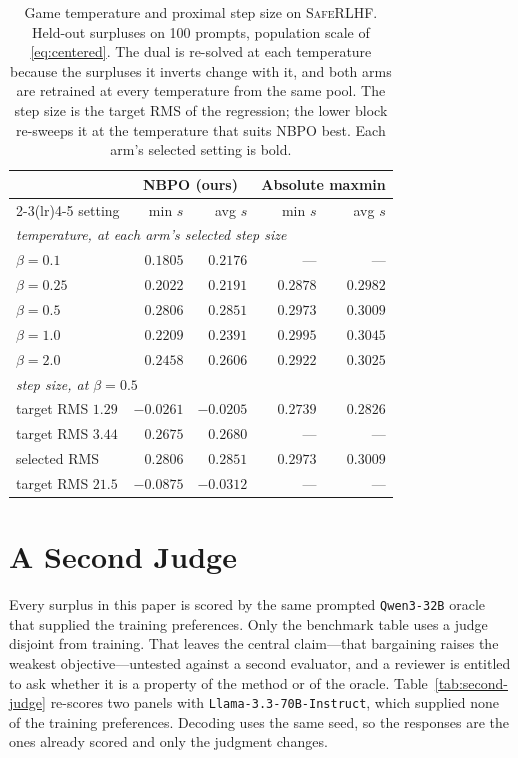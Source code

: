 \documentclass{article}
\theoremstyle{remark}
\theoremstyle{plain}
\newcommand{\NBPO}{\textsc{NBPO}}
\begin{document}
\begin{table}[htbp]
\centering\footnotesize
\setlength{\tabcolsep}{4.0pt}
\caption{Game temperature and proximal step size on \textsc{SafeRLHF}. Held-out surpluses on 100 prompts,
population scale of \eqref{eq:centered}. The dual is re-solved at each temperature because the surpluses
it inverts change with it, and both arms are retrained at every temperature from the same pool. The step
size is the target RMS of the regression; the lower block re-sweeps it at the temperature that suits
\NBPO{} best. Each arm's selected setting is bold.}
\label{tab:beta-saferlhf}
\begin{tabular}{lrrrr}
\toprule
& \multicolumn{2}{c}{\NBPO{} (ours)} & \multicolumn{2}{c}{Absolute maxmin}\\
\cmidrule(lr){2-3}\cmidrule(lr){4-5}
setting & min $s$ & avg $s$ & min $s$ & avg $s$\\
\midrule
\multicolumn{5}{l}{\textit{temperature, at each arm's selected step size}}\\
$\beta=0.1$ & $0.1805$ & $0.2176$ & --- & ---\\
$\beta=0.25$ & $0.2022$ & $0.2191$ & $0.2878$ & $0.2982$\\
$\beta=0.5$ & $\mathbf{0.2806}$ & $\mathbf{0.2851}$ & $0.2973$ & $0.3009$\\
$\beta=1.0$ & $0.2209$ & $0.2391$ & $\mathbf{0.2995}$ & $\mathbf{0.3045}$\\
$\beta=2.0$ & $0.2458$ & $0.2606$ & $0.2922$ & $0.3025$\\
\midrule
\multicolumn{5}{l}{\textit{step size, at $\beta=0.5$}}\\
target RMS $1.29$ & $-0.0261$ & $-0.0205$ & $0.2739$ & $0.2826$\\
target RMS $3.44$ & $0.2675$ & $0.2680$ & --- & ---\\
selected RMS & $\mathbf{0.2806}$ & $\mathbf{0.2851}$ & $\mathbf{0.2973}$ & $\mathbf{0.3009}$\\
target RMS $21.5$ & $-0.0875$ & $-0.0312$ & --- & ---\\
\bottomrule
\end{tabular}
\end{table}




\section{A Second Judge}
\label{app:second-judge}
Every surplus in this paper is scored by the same prompted \texttt{Qwen3-32B} oracle that supplied the
training preferences. Only the benchmark table uses a judge disjoint from training. That leaves the
central claim---that bargaining raises the weakest objective---untested against a second evaluator, and a
reviewer is entitled to ask whether it is a property of the method or of the oracle.
Table~\ref{tab:second-judge} re-scores two panels with \texttt{Llama-3.3-70B-Instruct}, which supplied
none of the training preferences. Decoding uses the same seed, so the responses are the ones already
scored and only the judgment changes.
\end{document}
